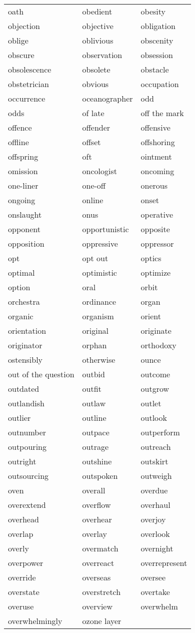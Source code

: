 \documentclass{minimal}
\begin{document}
\begin{longtable}{p{2.7cm}@{\hskip 0.2cm}p{2.7cm}@{\hskip 0.2cm}p{2.7cm}}
oath & obedient & obesity \\
objection & objective & obligation \\
oblige & oblivious & obscenity \\
obscure & observation & obsession \\
obsolescence & obsolete & obstacle \\
obstetrician & obvious & occupation \\
occurrence & oceanographer & odd \\
odds & of late & off the mark \\
offence & offender & offensive \\
offline & offset & offshoring \\
offspring & oft & ointment \\
omission & oncologist & oncoming \\
one-liner & one-off & onerous \\
ongoing & online & onset \\
onslaught & onus & operative \\
opponent & opportunistic & opposite \\
opposition & oppressive & oppressor \\
opt & opt out & optics \\
optimal & optimistic & optimize \\
option & oral & orbit \\
orchestra & ordinance & organ \\
organic & organism & orient \\
orientation & original & originate \\
originator & orphan & orthodoxy \\
ostensibly & otherwise & ounce \\
out of the question & outbid & outcome \\
outdated & outfit & outgrow \\
outlandish & outlaw & outlet \\
outlier & outline & outlook \\
outnumber & outpace & outperform \\
outpouring & outrage & outreach \\
outright & outshine & outskirt \\
outsourcing & outspoken & outweigh \\
oven & overall & overdue \\
overextend & overflow & overhaul \\
overhead & overhear & overjoy \\
overlap & overlay & overlook \\
overly & overmatch & overnight \\
overpower & overreact & overrepresent \\
override & overseas & oversee \\
overstate & overstretch & overtake \\
overuse & overview & overwhelm \\
overwhelmingly & ozone layer
\end{longtable}
\end{document}
